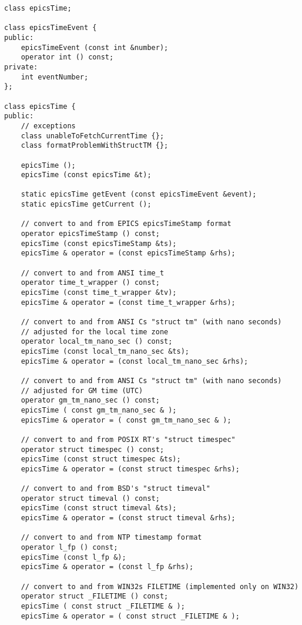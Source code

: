 \begin{verbatim}
class epicsTime;

class epicsTimeEvent {
public:
    epicsTimeEvent (const int &number);
    operator int () const;
private:
    int eventNumber;
};

class epicsTime {
public:
    // exceptions
    class unableToFetchCurrentTime {};
    class formatProblemWithStructTM {};

    epicsTime ();
    epicsTime (const epicsTime &t);

    static epicsTime getEvent (const epicsTimeEvent &event);
    static epicsTime getCurrent ();

    // convert to and from EPICS epicsTimeStamp format
    operator epicsTimeStamp () const;
    epicsTime (const epicsTimeStamp &ts);
    epicsTime & operator = (const epicsTimeStamp &rhs);

    // convert to and from ANSI time_t 
    operator time_t_wrapper () const;
    epicsTime (const time_t_wrapper &tv);
    epicsTime & operator = (const time_t_wrapper &rhs);

    // convert to and from ANSI Cs "struct tm" (with nano seconds)
    // adjusted for the local time zone
    operator local_tm_nano_sec () const;
    epicsTime (const local_tm_nano_sec &ts);
    epicsTime & operator = (const local_tm_nano_sec &rhs);

    // convert to and from ANSI Cs "struct tm" (with nano seconds)
    // adjusted for GM time (UTC)
    operator gm_tm_nano_sec () const;
    epicsTime ( const gm_tm_nano_sec & );
    epicsTime & operator = ( const gm_tm_nano_sec & );

    // convert to and from POSIX RT's "struct timespec"
    operator struct timespec () const;
    epicsTime (const struct timespec &ts);
    epicsTime & operator = (const struct timespec &rhs);

    // convert to and from BSD's "struct timeval"
    operator struct timeval () const;
    epicsTime (const struct timeval &ts);
    epicsTime & operator = (const struct timeval &rhs);

    // convert to and from NTP timestamp format
    operator l_fp () const;
    epicsTime (const l_fp &);
    epicsTime & operator = (const l_fp &rhs);

    // convert to and from WIN32s FILETIME (implemented only on WIN32)
    operator struct _FILETIME () const;
    epicsTime ( const struct _FILETIME & );
    epicsTime & operator = ( const struct _FILETIME & );


\end{verbatim}
